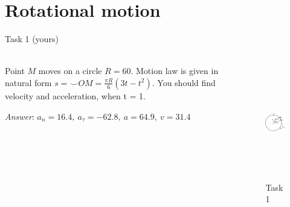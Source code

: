 \documentclass[aspectratio=169,xcolor=table,10pt, notes=hide]{beamer}
\begin{document}
\section*{Rotational motion}

\begin{frame}[t]{Task 1 (yours)}
    \framesubtitle{}
    \begin{columns}[c,onlytextwidth]
        \begin{column}{0.55\textwidth}
            Point $M$ moves on a circle $R=60$. Motion law is given in natural form $s=\smallsmile OM = \frac{\pi R}{6}(3t-t^2) $. You should find velocity and acceleration, when t = 1.
            \medskip

            \textit{Answer}: $a_n = 16.4,\ a_\tau = -62.8,\ a = 64.9,\ v = 31.4$
        \end{column}
        \begin{column}{0.44\textwidth}
            \begin{figure}[H]
                \centering\includegraphics[height=5cm,width=1\textwidth,keepaspectratio]{image9.png}
                \caption*{Task 1}
                \label{fig:image9.png}
            \end{figure}
        \end{column}
    \end{columns}
\end{frame}
\end{document}

